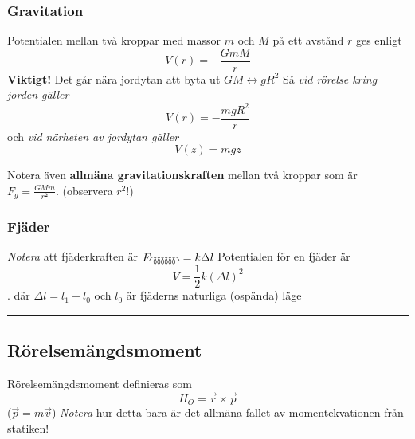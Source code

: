\documentclass{article}
\newenvironment{ankiflashcard}[1]{}{}
\newcommand{\ruler}{
\rule{0.5\textwidth}{0.5pt}
}
\begin{document}
\begin{paracol}{2}
\begin{ankiflashcard}{Definiera gravitationspotentialen, i alla tre fall.}
\subsubsection{Gravitation}
Potentialen mellan två kroppar med massor $m$ och $M$ på ett avstånd $r$ ges enligt
$$
V(r)=-\frac{GmM}{r}
$$
\textbf{Viktigt!} Det går nära jordytan att byta ut $GM\longleftrightarrow gR^2$
Så \textit{vid rörelse kring jorden gäller}
$$
V(r)=-\frac{mgR^2}{r}
$$
och \textit{vid närheten av jordytan gäller}
$$
V(z)=mgz
$$
\end{ankiflashcard}

\begin{ankiflashcard}{Definera allmäna gravitationskraften.}
    Notera även \textbf{allmäna gravitationskraften } mellan två kroppar som är $F_g = \frac{GMm}{r^{\mathbf 2}}$. (observera $r^2$!)
\end{ankiflashcard}
\begin{ankiflashcard}{Definiera potentialenergi och fjäderkraft för en fjäder.}
    \subsubsection{Fjäder}
    \textit{Notera} att fjäderkraften är $F_{\gluon}=k\Delta l$
    Potentialen för en fjäder är
    $$
    V = \frac{1}{2}k(\Delta l)^2
    $$ .
    där $\Delta l=l_1-l_0$ och $l_0$ är fjäderns naturliga (ospända) läge
\end{ankiflashcard}
\ruler

\begin{ankiflashcard}{Definiera rörelsemängdsmoment}
    
\subsection{Rörelsemängdsmoment}
Rörelsemängdsmoment definieras som
$$
H_O = \vec r \times \vec p
$$
($\vec p = m \vec v$)
\textit{Notera} hur detta bara är det allmäna fallet av momentekvationen från statiken!
\end{ankiflashcard}


\begin{ankiflashcard}{Definiera rörelsemängdsmomentlagen.}

\end{ankiflashcard}
\end{paracol}
\end{document}
